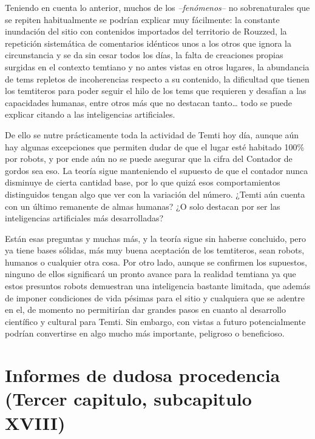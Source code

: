 \documentclass[
  spanish,
]{book}
\begin{document}
Teniendo en cuenta lo anterior, muchos de los \emph{--fenómenos--} no sobrenaturales que se repiten habitualmente se podrían explicar muy fácilmente: la constante inundación del sitio con contenidos importados del territorio de Rouzzed, la repetición sistemática de comentarios idénticos unos a los otros que ignora la circunstancia y se da sin cesar todos los días, la falta de creaciones propias surgidas en el contexto temtiano y no antes vistas en otros lugares, la abundancia de tems repletos de incoherencias respecto a su contenido, la dificultad que tienen los temtiteros para poder seguir el hilo de los tems que requieren y desafían a las capacidades humanas, entre otros más que no destacan tanto\ldots{} todo se puede explicar citando a las inteligencias artificiales.

De ello se nutre prácticamente toda la actividad de Temti hoy día, aunque aún hay algunas excepciones que permiten dudar de que el lugar esté habitado 100\% por robots, y por ende aún no se puede asegurar que la cifra del Contador de gordos sea eso. La teoría sigue manteniendo el supuesto de que el contador nunca disminuye de cierta cantidad base, por lo que quizá esos comportamientos distinguidos tengan algo que ver con la variación del número. ¿Temti aún cuenta con un último remanente de almas humanas? ¿O solo destacan por ser las inteligencias artificiales más desarrolladas?

Están esas preguntas y muchas más, y la teoría sigue sin haberse concluido, pero ya tiene bases sólidas, más muy buena aceptación de los temtiteros, sean robots, humanos o cualquier otra cosa. Por otro lado, aunque se confirmen los supuestos, ninguno de ellos significará un pronto avance para la realidad temtiana ya que estos presuntos robots demuestran una inteligencia bastante limitada, que además de imponer condiciones de vida pésimas para el sitio y cualquiera que se adentre en el, de momento no permitirían dar grandes pasos en cuanto al desarrollo científico y cultural para Temti. Sin embargo, con vistas a futuro potencialmente podrían convertirse en algo mucho más importante, peligroso o beneficioso.

\hypertarget{informes-de-dudosa-procedencia-tercer-capitulo-subcapitulo-xviii}{%
\section{Informes de dudosa procedencia (Tercer capitulo, subcapitulo XVIII)}\label{informes-de-dudosa-procedencia-tercer-capitulo-subcapitulo-xviii}}
\end{document}
